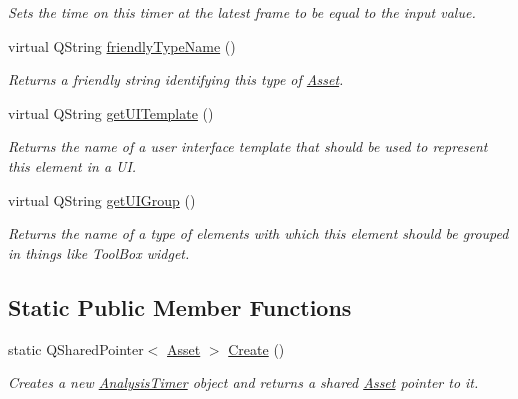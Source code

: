 \begin{DoxyCompactItemize}
\begin{DoxyCompactList}\small\item\em Sets the time on this timer at the latest frame to be equal to the input value. \end{DoxyCompactList}\item 
virtual Q\-String \hyperlink{class_picto_1_1_analysis_timer_af529f909624a1dd1dfac1faae8f81c0d}{friendly\-Type\-Name} ()
\begin{DoxyCompactList}\small\item\em Returns a friendly string identifying this type of \hyperlink{class_picto_1_1_asset}{Asset}. \end{DoxyCompactList}\item 
\hypertarget{class_picto_1_1_analysis_timer_a2b2e634ff2daa14001d295e8e91d4604}{virtual Q\-String \hyperlink{class_picto_1_1_analysis_timer_a2b2e634ff2daa14001d295e8e91d4604}{get\-U\-I\-Template} ()}\label{class_picto_1_1_analysis_timer_a2b2e634ff2daa14001d295e8e91d4604}

\begin{DoxyCompactList}\small\item\em Returns the name of a user interface template that should be used to represent this element in a U\-I. \end{DoxyCompactList}\item 
\hypertarget{class_picto_1_1_analysis_timer_a013d88fe3a1f43cf6643e37e09adeab7}{virtual Q\-String \hyperlink{class_picto_1_1_analysis_timer_a013d88fe3a1f43cf6643e37e09adeab7}{get\-U\-I\-Group} ()}\label{class_picto_1_1_analysis_timer_a013d88fe3a1f43cf6643e37e09adeab7}

\begin{DoxyCompactList}\small\item\em Returns the name of a type of elements with which this element should be grouped in things like Tool\-Box widget. \end{DoxyCompactList}\end{DoxyCompactItemize}
\subsection*{Static Public Member Functions}
\begin{DoxyCompactItemize}
\item 
\hypertarget{class_picto_1_1_analysis_timer_a85590587605ed8652dd4d60be6979cd5}{static Q\-Shared\-Pointer$<$ \hyperlink{class_picto_1_1_asset}{Asset} $>$ \hyperlink{class_picto_1_1_analysis_timer_a85590587605ed8652dd4d60be6979cd5}{Create} ()}\label{class_picto_1_1_analysis_timer_a85590587605ed8652dd4d60be6979cd5}

\begin{DoxyCompactList}\small\item\em Creates a new \hyperlink{class_picto_1_1_analysis_timer}{Analysis\-Timer} object and returns a shared \hyperlink{class_picto_1_1_asset}{Asset} pointer to it. \end{DoxyCompactList}\end{DoxyCompactItemize}
